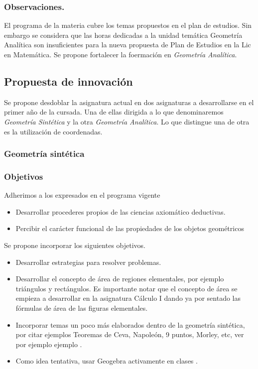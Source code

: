 \documentclass[a4paper,10pt,BCOR10mm,oneside,headsepline]{scrbook}
\begin{document}
\subsubsection{Observaciones.} El programa de la materia cubre los temas propuestos en el plan de estudios. Sin embargo se considera que las horas dedicadas a la unidad temática Geometría Analítica son insuficientes para la nueva propuesta de Plan de Estudios en la Lic en Matemática. Se propone fortalecer la foermación en  \emph{Geometría Analítica}.  





\subsection{Propuesta de innovación} Se propone desdoblar la asignatura actual en dos asignaturas a desarrollarse en el primer año de la cursada. Una de ellas dirigida a lo que denominaremos \emph{Geometría Sintética} y la otra \emph{Geometría Analítica}. Lo que distingue una de otra es la utilización de coordenadas. 

\subsubsection{Geometría sintética} 
\subsubsection{Objetivos} 

Adherimos a los expresados en el programa vigente
\begin{itemize}
 \item Desarrollar procederes propios de las ciencias axiomático deductivas.
 \item  Percibir el carácter funcional de las propiedades de los objetos
geométricos
 \end{itemize}

Se propone incorporar los siguientes objetivos.

\begin{itemize}
  \item Desarrollar estrategias para resolver problemas.
  \item Desarrollar el concepto de área de regiones elementales, por ejemplo triángulos y rectángulos. Es importante notar que el concepto de área se empieza a desarrollar en la asignatura Cálculo I dando ya por sentado las fórmulas de área de las figuras elementales.
  \item Incorporar temas un poco más elaborados dentro de la geometría sintética, por citar ejemplos Teoremas de Ceva, Napoleón, 9 puntos, Morley, etc, ver por ejemplo ejemplo \cite{O.Bottema149,H.S.M.Coxeter35,H.S.M.Coxeter226,RogerFenn248,AllanBerele41}.
  \item Como idea tentativa, usar Geogebra activamente en clases \cite{GerardA.Venema145}.
\end{itemize}
\end{document}
